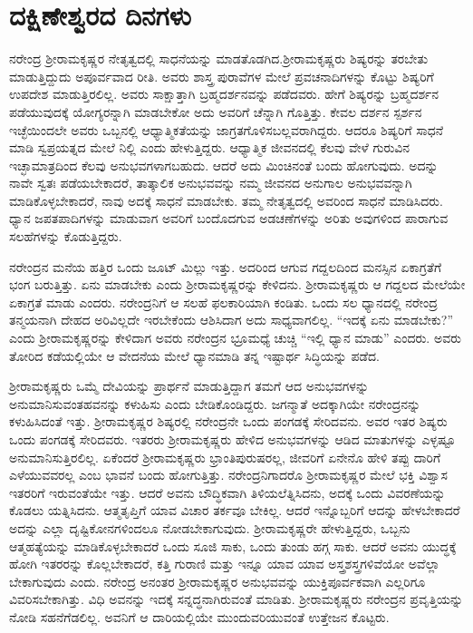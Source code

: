 
\chapter{ದಕ್ಷಿಣೇಶ್ವರದ ದಿನಗಳು}

ನರೇಂದ್ರ ಶ‍್ರೀರಾಮಕೃಷ್ಣರ ನೇತೃತ್ವದಲ್ಲಿ ಸಾಧನೆಯನ್ನು ಮಾಡತೊಡಗಿದ.\break ಶ‍್ರೀರಾಮಕೃಷ್ಣರು ಶಿಷ್ಯರನ್ನು ತರಬೇತು ಮಾಡುತ್ತಿದ್ದುದು ಅಪೂರ್ವವಾದ ರೀತಿ. ಅವರು ಶಾಸ್ತ್ರ ಪುರಾವೆಗಳ ಮೇಲೆ ಪ್ರವಚನಾದಿಗಳನ್ನು ಕೊಟ್ಟು ಶಿಷ್ಯರಿಗೆ ಉಪದೇಶ ಮಾಡುತ್ತಿರಲಿಲ್ಲ. ಅವರು ಸಾಕ್ಷಾತ್ತಾಗಿ ಬ್ರಹ್ಮದರ್ಶನವನ್ನು ಪಡೆದವರು. ಹೇಗೆ ಶಿಷ್ಯರನ್ನು ಬ್ರಹ್ಮದರ್ಶನ ಪಡೆಯುವುದಕ್ಕೆ ಯೋಗ್ಯರನ್ನಾಗಿ ಮಾಡಬೇಕೋ ಅದು ಅವರಿಗೆ ಚೆನ್ನಾಗಿ ಗೊತ್ತಿತ್ತು. ಕೇವಲ ದರ್ಶನ ಸ್ಪರ್ಶನ ಇಚ್ಛೆಯಿಂದಲೇ ಅವರು ಒಬ್ಬನಲ್ಲಿ ಆಧ್ಯಾತ್ಮಿಕತೆಯನ್ನು ಜಾಗ್ರತಗೊಳಿಸಬಲ್ಲವರಾಗಿದ್ದರು. ಆದರೂ ಶಿಷ್ಯರಿಗೆ ಸಾಧನೆ ಮಾಡಿ ಸ್ವಪ್ರಯತ್ನದ ಮೇಲೆ ನಿಲ್ಲಿ ಎಂದು ಹೇಳುತ್ತಿದ್ದರು. ಆಧ್ಯಾತ್ಮಿಕ ಜೀವನದಲ್ಲಿ ಕೆಲವು ವೇಳೆ ಗುರುವಿನ ಇಚ್ಛಾಮಾತ್ರದಿಂದ ಕೆಲವು ಅನುಭವಗಳಾಗಬಹುದು. ಆದರೆ ಅದು ಮಿಂಚಿನಂತೆ ಬಂದು ಹೋಗುವುದು. ಅದನ್ನು ನಾವೇ ಸ್ವತಃ ಪಡೆಯಬೇಕಾದರೆ, ತಾತ್ಕಾಲಿಕ ಅನುಭವವನ್ನು ನಮ್ಮ ಜೀವನದ ಅನುಗಾಲ ಅನುಭವವನ್ನಾಗಿ ಮಾಡಿಕೊಳ್ಳಬೇಕಾದರೆ, ನಾವು ಅದಕ್ಕೆ ಸಾಧನೆ ಮಾಡಬೇಕು. ತಮ್ಮ ನೇತೃತ್ವದಲ್ಲಿ ಅವರಿಂದ ಸಾಧನೆ ಮಾಡಿಸಿದರು. ಧ್ಯಾನ ಜಪತಪಾದಿಗಳನ್ನು ಮಾಡುವಾಗ ಅವರಿಗೆ ಬಂದೊದಗುವ ಅಡಚಣೆಗಳನ್ನು ಅರಿತು ಅವುಗಳಿಂದ ಪಾರಾಗುವ ಸಲಹೆಗಳನ್ನು ಕೊಡುತ್ತಿದ್ದರು.

ನರೇಂದ್ರನ ಮನೆಯ ಹತ್ತಿರ ಒಂದು ಜೂಟ್ ಮಿಲ್ಲು ಇತ್ತು. ಅದರಿಂದ ಆಗುವ ಗದ್ದಲದಿಂದ ಮನಸ್ಸಿನ ಏಕಾಗ್ರತೆಗೆ ಭಂಗ ಬರುತ್ತಿತ್ತು. ಏನು ಮಾಡಬೇಕು ಎಂದು ಶ‍್ರೀರಾಮಕೃಷ್ಣರನ್ನು ಕೇಳಿದನು. ಶ‍್ರೀರಾಮಕೃಷ್ಣರು ಆ ಗದ್ದಲದ ಮೇಲೆಯೇ ಏಕಾಗ್ರತೆ ಮಾಡು ಎಂದರು. ನರೇಂದ್ರನಿಗೆ ಆ ಸಲಹೆ ಫಲಕಾರಿಯಾಗಿ ಕಂಡಿತು. ಒಂದು ಸಲ ಧ್ಯಾನದಲ್ಲಿ ನರೇಂದ್ರ ತನ್ಮಯನಾಗಿ ದೇಹದ ಅರಿವಿಲ್ಲದೇ ಇರಬೇಕೆಂದು ಆಶಿಸಿದಾಗ ಅದು ಸಾಧ್ಯವಾಗಲಿಲ್ಲ. “ಇದಕ್ಕೆ ಏನು ಮಾಡಬೇಕು?” ಎಂದು ಶ‍್ರೀರಾಮಕೃಷ್ಣರನ್ನು ಕೇಳಿದಾಗ ಅವರು ನರೇಂದ್ರನ ಭ್ರೂಮಧ್ಯೆ ಚುಚ್ಚಿ “ಇಲ್ಲಿ ಧ್ಯಾನ ಮಾಡು” ಎಂದರು. ಅವರು ತೋರಿದ ಕಡೆಯಲ್ಲಿಯೇ ಆ ವೇದನೆಯ ಮೇಲೆ ಧ್ಯಾನಮಾಡಿ ತನ್ನ ಇಷ್ಟಾರ್ಥ ಸಿದ್ಧಿಯನ್ನು ಪಡೆದ.

ಶ‍್ರೀರಾಮಕೃಷ್ಣರು ಒಮ್ಮೆ ದೇವಿಯನ್ನು ಪ್ರಾರ್ಥನೆ ಮಾಡುತ್ತಿದ್ದಾಗ ತಮಗೆ ಆದ ಅನುಭವಗಳನ್ನು ಅನುಮಾನಿಸುವಂತಹವನನ್ನು ಕಳುಹಿಸು ಎಂದು ಬೇಡಿಕೊಂಡಿದ್ದರು. ಜಗನ್ಮಾತೆ ಅದಕ್ಕಾಗಿಯೇ ನರೇಂದ್ರನನ್ನು ಕಳುಹಿಸಿದಂತೆ ಇತ್ತು. ಶ‍್ರೀರಾಮಕೃಷ್ಣರ ಶಿಷ್ಯರಲ್ಲಿ ನರೇಂದ್ರನೇ ಒಂದು ಪಂಗಡಕ್ಕೆ ಸೇರಿದವನು. ಅವರ ಇತರ ಶಿಷ್ಯರು ಒಂದು ಪಂಗಡಕ್ಕೆ ಸೇರಿದವರು. ಇತರರು ಶ‍್ರೀರಾಮಕೃಷ್ಣರು ಹೇಳಿದ ಅನುಭವಗಳನ್ನು ಆಡಿದ ಮಾತುಗಳನ್ನು ಎಳ್ಳಷ್ಟೂ ಅನುಮಾನಿಸುತ್ತಿರಲಿಲ್ಲ. ಏಕೆಂದರೆ ಶ‍್ರೀರಾಮಕೃಷ್ಣರು ಭ್ರಾಂತಿಪುರುಷರಲ್ಲ, ಜೀವರಿಗೆ ಏನೇನೊ ಹೇಳಿ ತಪ್ಪು ದಾರಿಗೆ ಎಳೆಯುವವರಲ್ಲ ಎಂಬ ಭಾವನೆ ಬಂದು ಹೋಗುತ್ತಿತ್ತು. ನರೇಂದ್ರನಿಗಾದರೊ ಶ‍್ರೀರಾಮಕೃಷ್ಣರ ಮೇಲೆ ಭಕ್ತಿ ವಿಶ್ವಾಸ ಇತರರಿಗೆ ಇರುವಂತೆಯೇ ಇತ್ತು. ಆದರೆ ಅವನು ಬೌದ್ಧಿಕವಾಗಿ ತಿಳಿಯಲೆತ್ನಿಸಿದನು, ಅದಕ್ಕೆ ಒಂದು ವಿವರಣೆಯನ್ನು ಕೊಡಲು ಯತ್ನಿಸಿದನು. ಆತ್ಮತೃಪ್ತಿಗೆ ಯಾವ ವಿಚಾರ ತರ್ಕವೂ ಬೇಕಿಲ್ಲ. ಆದರೆ ಇನ್ನೊಬ್ಬರಿಗೆ ಆದನ್ನು ಹೇಳಬೇಕಾದರೆ ಅದನ್ನು ಎಲ್ಲಾ ದೃಷ್ಟಿಕೋನಗಳಿಂದಲೂ ನೋಡಬೇಕಾಗುವುದು. ಶ‍್ರೀರಾಮಕೃಷ್ಣರೇ ಹೇಳುತ್ತಿದ್ದರು, ಒಬ್ಬನು ಆತ್ಮಹತ್ಯೆಯನ್ನು ಮಾಡಿಕೊಳ್ಳಬೇಕಾದರೆ ಒಂದು ಸೂಜಿ ಸಾಕು, ಒಂದು ತುಂಡು ಹಗ್ಗ ಸಾಕು. ಆದರೆ ಅವನು ಯುದ್ಧಕ್ಕೆ ಹೋಗಿ ಇತರರನ್ನು ಕೊಲ್ಲಬೇಕಾದರೆ, ಕತ್ತಿ ಗುರಾಣಿ ಮತ್ತು ಇನ್ನೂ ಯಾವ ಯಾವ ಅಸ್ತ್ರಶಸ್ತ್ರಗಳಿವೆಯೋ ಅವೆಲ್ಲಾ ಬೇಕಾಗುವುದು ಎಂದು. ನರೇಂದ್ರ ಅನಂತರ ಶ‍್ರೀರಾಮಕೃಷ್ಣರ ಅನುಭವವನ್ನು ಯುಕ್ತಿಪೂರ್ವಕವಾಗಿ ಎಲ್ಲರಿಗೂ ವಿವರಿಸಬೇಕಾಗಿತ್ತು. ವಿಧಿ ಅವನನ್ನು ಇದಕ್ಕೆ ಸನ್ನದ್ಧನಾಗಿರುವಂತೆ ಮಾಡಿತು. ಶ‍್ರೀರಾಮಕೃಷ್ಣರು ನರೇಂದ್ರನ ಪ್ರವೃತ್ತಿಯನ್ನು ನೋಡಿ ಸಹನೆಗೆಡಲಿಲ್ಲ. ಅವನಿಗೆ ಆ ದಾರಿಯಲ್ಲಿಯೇ ಮುಂದುವರಿಯುವಂತೆ ಉತ್ತೇಜನ ಕೊಟ್ಟರು.

